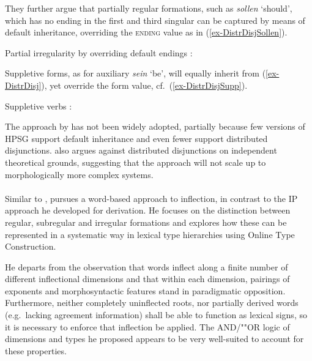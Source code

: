 \documentclass[output=paper,biblatex,babelshorthands,newtxmath,draftmode,colorlinks,citecolor=brown]{langscibook}
\begin{document}
They further argue that partially regular formations, such as
\textit{sollen} `should', which has no ending in the first and third
singular can be captured by means of default inheritance, overriding
the \textsc{ending} value as in (\ref{ex-DistrDisjSollen}).  

\ea
\label{ex-DistrDisjSollen}

Partial irregularity by overriding default endings \citep[105]{Krieger:Nerbonne:93}:\\
\z

Suppletive forms, as for auxiliary \textit{sein} `be', will equally
inherit from (\ref{ex-DistrDisj}), yet override the form value,
cf.\ (\ref{ex-DistrDisjSupp}).  

\ea
\label{ex-DistrDisjSupp}
Suppletive verbs \citep[106]{Krieger:Nerbonne:93}:\\
\z

The approach by \citet{Krieger:Nerbonne:93} has not been widely adopted, partially because few
versions of HPSG support default inheritance and even fewer support distributed
disjunctions. \citet[176--178]{Koenig99} also argues against distributed disjunctions on independent
theoretical grounds, suggesting that the approach will not scale up to morphologically more complex
systems.

\paragraph*{\citet{Koenig99}}

\largerpage
Similar to \citet{Krieger:Nerbonne:93}, \citet{Koenig99} pursues a
word-based approach to inflection, in contrast to the IP approach he
developed for derivation. He focuses on the distinction between
regular, subregular and irregular formations and explores how these
can be represented in a systematic way in lexical type hierarchies
using Online Type Construction.

He departs from the observation that words  inflect along a finite number
of different inflectional dimensions and that within each dimension,
pairings of exponents and morphosyntactic features stand in
paradigmatic opposition. Furthermore, neither completely uninflected
roots, nor partially derived words (e.g.\ lacking agreement
information) shall be able to function as lexical signs, so it is
necessary to enforce that inflection be applied. The AND/""OR
logic of dimensions and types he proposed appears to be very
well-suited to account for these properties. 
\end{document}
